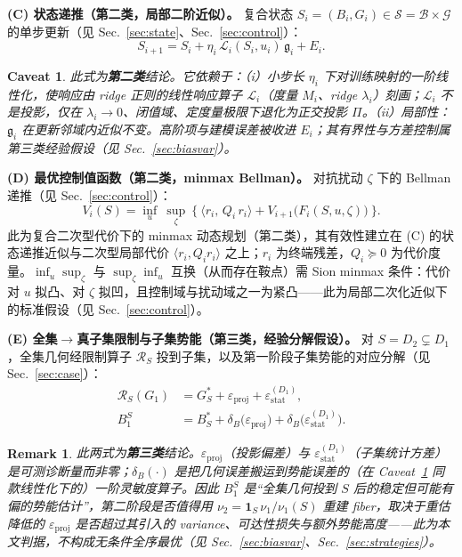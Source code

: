 \documentclass[11pt,a4paper]{article}
\newtheorem{remark}[theorem]{Remark}
\newtheorem{caveat}[theorem]{Caveat}
\newcommand{\cL}{\mathcal{L}}   %
\newcommand{\cS}{\mathcal{S}}   %
\newcommand{\cG}{\mathcal{G}}   %
\newcommand{\cB}{\mathcal{B}}   %
\newcommand{\Rstr}{\mathcal{R}}     %
\newcommand{\ProjectOp}{\Pi}        %
\newcommand{\gres}{\bm{\mathfrak{g}}} %
\begin{document}
\medskip
\noindent\textbf{(C) 状态递推（第二类，局部二阶近似）。}
复合状态 $S_i=(B_i,G_i)\in\cS=\cB\times\cG$ 的单步更新（见 Sec.~\ref{sec:state}、Sec.~\ref{sec:control}）：
\begin{equation*}
S_{i+1}=S_i+\eta_i\,\cL_i(S_i,u_i)\,\gres_i+E_i .
\end{equation*}
\begin{caveat}\label{cav:s14:recursion}
此式为\textbf{第二类}结论。它依赖于：（i）小步长 $\eta_i$ 下对训练映射的一阶线性化，使响应由 ridge 正则的线性响应算子 $\cL_i$（度量 $M_i$、ridge $\lambda_i$）刻画；$\cL_i$ \emph{不是}投影，仅在 $\lambda_i\to0$、闭值域、定度量极限下退化为正交投影 $\ProjectOp$。（ii）局部性：$\gres_i$ 在更新邻域内近似不变。高阶项与建模误差被收进 $E_i$；其有界性与方差控制属第三类经验假设（见 Sec.~\ref{sec:biasvar}）。
\end{caveat}

\medskip
\noindent\textbf{(D) 最优控制值函数（第二类，minmax Bellman）。}
对抗扰动 $\zeta$ 下的 Bellman 递推（见 Sec.~\ref{sec:control}）：
\begin{equation*}
V_i(S)=\inf_{u}\ \sup_{\zeta}\ \Big\{\ \langle r_i,\,Q_i\,r_i\rangle+V_{i+1}\!\big(F_i(S,u,\zeta)\big)\ \Big\}.
\end{equation*}
此为复合二次型代价下的 minmax 动态规划（第二类），其有效性建立在 (C) 的状态递推近似与二次型局部代价 $\langle r_i,Q_i r_i\rangle$ 之上；$r_i$ 为终端残差，$Q_i\succeq0$ 为代价度量。$\inf_u\sup_\zeta$ 与 $\sup_\zeta\inf_u$ 互换（从而存在鞍点）需 Sion minmax 条件：代价对 $u$ 拟凸、对 $\zeta$ 拟凹，且控制域与扰动域之一为紧凸——此为局部二次化近似下的标准假设（见 Sec.~\ref{sec:control}）。

\medskip
\noindent\textbf{(E) 全集$\to$真子集限制与子集势能（第三类，经验分解假设）。}
对 $S=D_2\subsetneq D_1$，全集几何经限制算子 $\Rstr_S$ 投到子集，以及第一阶段子集势能的对应分解（见 Sec.~\ref{sec:case}）：
\begin{align*}
\Rstr_S(G_1) &= G_S^* + \varepsilon_{\mathrm{proj}} + \varepsilon_{\mathrm{stat}}^{(D_1)}, \\
B_1^S &= B_S^* + \delta_B\!\big(\varepsilon_{\mathrm{proj}}\big) + \delta_B\!\big(\varepsilon_{\mathrm{stat}}^{(D_1)}\big).
\end{align*}
\begin{remark}\label{rem:s14:restriction}
此两式为\textbf{第三类}结论。$\varepsilon_{\mathrm{proj}}$（投影偏差）与 $\varepsilon_{\mathrm{stat}}^{(D_1)}$（子集统计方差）是\emph{可测诊断量}而非零；$\delta_B(\cdot)$ 是把几何误差搬运到势能误差的（在 Caveat~\ref{cav:s14:recursion} 同款线性化下的）一阶灵敏度算子。因此 $B_1^S$ 是“全集几何投到 $S$ 后的稳定但可能有偏的势能估计”，第二阶段是否值得用 $\nu_2=\mathbf{1}_S\,\nu_1/\nu_1(S)$ 重建 fiber，取决于重估降低的 $\varepsilon_{\mathrm{proj}}$ 是否超过其引入的 variance、可达性损失与额外势能高度——此为本文判据，不构成无条件全序最优（见 Sec.~\ref{sec:biasvar}、Sec.~\ref{sec:strategies}）。
\end{remark}
\end{document}
